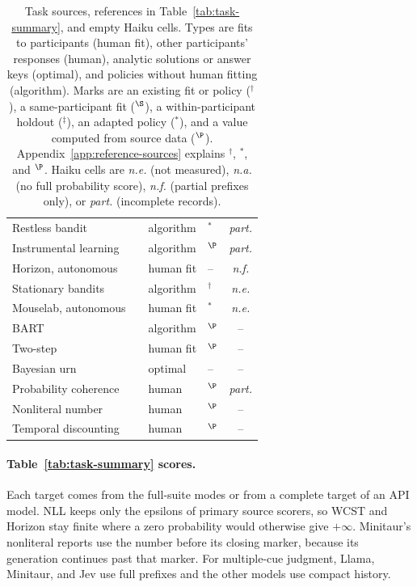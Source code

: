 \documentclass[11pt,a4paper]{article}
\begin{document}
\begin{table}[t]
\begin{tabular}{@{}llllc@{}}
Restless bandit & \citealp{codaforno2024cogbench} & algorithm & $^\ast$ & \textit{part.} \\
Instrumental learning & \citealp{lefebvre2017optimistic} & algorithm & $^\P$ & \textit{part.} \\
Horizon, autonomous & \citealp{wilson2014exploration,namazova2025centaur} & human fit & -- & \textit{n.f.} \\
Stationary bandits & \citealp{nie2025evolve} & algorithm & $^\dagger$ & \textit{n.e.} \\
\addlinespace[2pt]
Mouselab, autonomous & \citealp{callaway2022planning} & human fit & $^\ast$ & \textit{n.e.} \\
BART & \citealp{frey2017risk} & algorithm & $^\P$ & -- \\
Two-step & \citealp{daw2011model} & human fit & $^\P$ & -- \\
\addlinespace[2pt]
Bayesian urn & \citealp{codaforno2024cogbench} & optimal & -- & -- \\
Probability coherence & \citealp{zhu2020bayesian} & human & $^\P$ & \textit{part.} \\
Nonliteral number & \citealp{kao2014nonliteral,tsvilodub2025nonliteral} & human & $^\P$ & -- \\
\addlinespace[2pt]
Temporal discounting & \citealp{codaforno2024cogbench} & human & $^\P$ & -- \\
\bottomrule
\end{tabular}
\caption{Task sources, references in Table~\ref{tab:task-summary}, and empty Haiku cells. Types are fits to participants (human fit), other participants' responses (human), analytic solutions or answer keys (optimal), and policies without human fitting (algorithm). Marks are an existing fit or policy ($^\dagger$), a same-participant fit ($^\S$), a within-participant holdout ($^\ddagger$), an adapted policy ($^\ast$), and a value computed from source data ($^\P$). Appendix~\ref{app:reference-sources} explains $^\dagger$, $^\ast$, and $^\P$. Haiku cells are \textit{n.e.} (not measured), \textit{n.a.} (no full probability score), \textit{n.f.} (partial prefixes only), or \textit{part.} (incomplete records).}
\label{tab:table2-references}
\end{table}


\paragraph{Table~\ref{tab:task-summary} scores.}
Each target comes from the full-suite modes or from a complete target of an API model. NLL keeps only the epsilons of primary source scorers, so WCST and Horizon stay finite where a zero probability would otherwise give $+\infty$. Minitaur's nonliteral reports use the number before its closing marker, because its generation continues past that marker. For multiple-cue judgment, Llama, Minitaur, and Jev use full prefixes and the other models use compact history.
\end{document}
